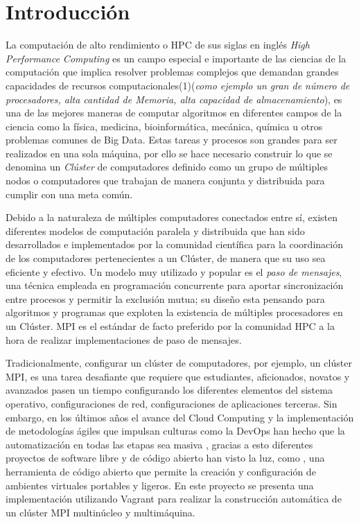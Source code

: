 \documentclass[letterpaper, 12pt, oneside]{article}
\begin{document}
	\section{Introducción}
	
	La computación de alto rendimiento o HPC de sus siglas en inglés \textit{High Performance Computing} es un campo especial e importante de las ciencias de la computación que implica resolver problemas complejos que demandan grandes capacidades de recursos computacionales(1)(\textit{como ejemplo un gran de número de procesadores, alta cantidad de Memoria, alta capacidad de almacenamiento}), es una de las mejores maneras de computar algoritmos en diferentes campos de la ciencia como la física, medicina, bioinformática,  mecánica, química u otros problemas comunes de Big Data. Estas tareas y procesos son  grandes para ser realizados en una sola máquina, por ello se hace necesario construir lo que se denomina un \textit{Clúster} de computadores definido como un grupo de múltiples nodos o computadores que trabajan de manera conjunta y distribuida para cumplir con una meta común. 
	
	Debido a la naturaleza de múltiples computadores conectados entre sí, existen diferentes modelos de computación paralela y distribuida que han sido desarrollados e implementados por la comunidad científica para la coordinación de los computadores pertenecientes a un Clúster, de manera que su uso sea eficiente y efectivo. Un modelo muy utilizado y popular es el \textit{paso de mensajes}, una técnica empleada en programación concurrente para aportar sincronización entre procesos y permitir la exclusión mutua; su diseño esta pensando para algoritmos y programas que exploten la existencia de múltiples procesadores en un Clúster. MPI es el estándar de facto preferido por la comunidad HPC a la hora de realizar implementaciones de paso de mensajes.

    Tradicionalmente, configurar un clúster de computadores, por ejemplo, un clúster MPI, es una tarea desafiante que requiere que estudiantes, aficionados, novatos y avanzados pasen un tiempo configurando los diferentes elementos del sistema operativo, configuraciones de red, configuraciones de aplicaciones terceras. Sin embargo, en los últimos años el avance del Cloud Computing y la implementación de metodologías ágiles que impulsan culturas como la DevOps han hecho que la automatización en todas las etapas sea masiva  \cite{devopsH2} \cite{devopsH3} , gracias a esto  diferentes proyectos de software libre y de código abierto han visto la luz, como , una herramienta de código abierto que permite la creación y configuración de ambientes virtuales portables y ligeros. En este proyecto se presenta una implementación utilizando Vagrant para realizar  la construcción automática de un clúster MPI multinúcleo y multimáquina.
    
\end{document}
